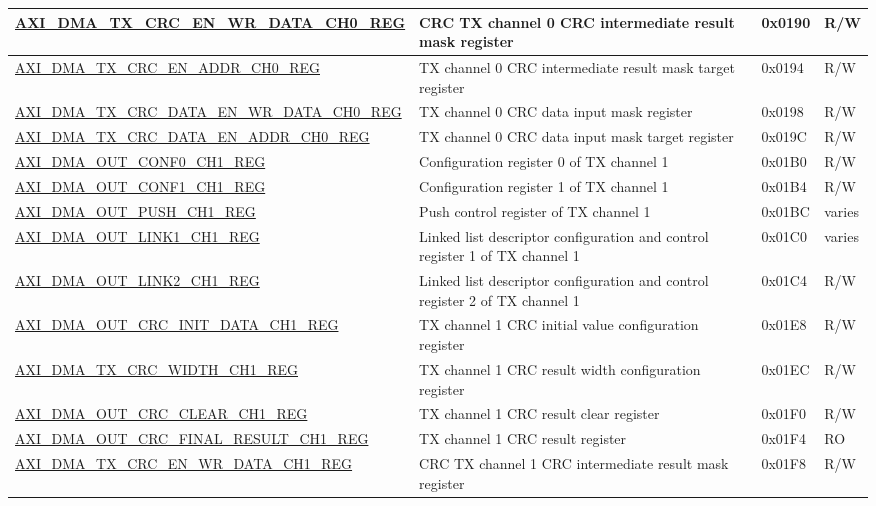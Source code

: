 \begin{longtable}{ | l | p{10cm} | p{1.3cm} | l | }
\hyperref[regdesc:AXIDMATXCRCENWRDATACHNREG]{AXI\_DMA\_TX\_CRC\_EN\_WR\_DATA\_CH0\_REG} & CRC TX channel 0 CRC intermediate result mask register & 0x0190 & R/W \\ \hline
\hyperref[regdesc:AXIDMATXCRCENADDRCHNREG]{AXI\_DMA\_TX\_CRC\_EN\_ADDR\_CH0\_REG} & TX channel 0 CRC intermediate result mask target register & 0x0194 & R/W \\ \hline
\hyperref[regdesc:AXIDMATXCRCDATAENWRDATACHNREG]{AXI\_DMA\_TX\_CRC\_DATA\_EN\_WR\_DATA\_CH0\_REG} & TX channel 0 CRC data input mask register & 0x0198 & R/W \\ \hline
\hyperref[regdesc:AXIDMATXCRCDATAENADDRCHNREG]{AXI\_DMA\_TX\_CRC\_DATA\_EN\_ADDR\_CH0\_REG} & TX channel 0 CRC data input mask target register & 0x019C & R/W \\ \hline
\hyperref[regdesc:AXIDMAOUTCONF0CHNREG]{AXI\_DMA\_OUT\_CONF0\_CH1\_REG} & Configuration register 0 of TX channel 1 & 0x01B0 & R/W \\ \hline
\hyperref[regdesc:AXIDMAOUTCONF1CHNREG]{AXI\_DMA\_OUT\_CONF1\_CH1\_REG} & Configuration register 1 of TX channel 1 & 0x01B4 & R/W \\ \hline
\hyperref[regdesc:AXIDMAOUTPUSHCHNREG]{AXI\_DMA\_OUT\_PUSH\_CH1\_REG} & Push control register of TX channel 1 & 0x01BC & varies \\ \hline
\hyperref[regdesc:AXIDMAOUTLINK1CHNREG]{AXI\_DMA\_OUT\_LINK1\_CH1\_REG} & Linked list descriptor configuration and control register 1 of TX channel 1 & 0x01C0 & varies \\ \hline
\hyperref[regdesc:AXIDMAOUTLINK2CHNREG]{AXI\_DMA\_OUT\_LINK2\_CH1\_REG} & Linked list descriptor configuration and control register 2 of TX channel 1 & 0x01C4 & R/W \\ \hline
\hyperref[regdesc:AXIDMAOUTCRCINITDATACHNREG]{AXI\_DMA\_OUT\_CRC\_INIT\_DATA\_CH1\_REG} & TX channel 1 CRC initial value configuration register & 0x01E8 & R/W \\ \hline
\hyperref[regdesc:AXIDMATXCRCWIDTHCHNREG]{AXI\_DMA\_TX\_CRC\_WIDTH\_CH1\_REG} & TX channel 1 CRC result width configuration register & 0x01EC & R/W \\ \hline
\hyperref[regdesc:AXIDMAOUTCRCCLEARCHNREG]{AXI\_DMA\_OUT\_CRC\_CLEAR\_CH1\_REG} & TX channel 1 CRC result clear register & 0x01F0 & R/W \\ \hline
\hyperref[regdesc:AXIDMAOUTCRCFINALRESULTCHNREG]{AXI\_DMA\_OUT\_CRC\_FINAL\_RESULT\_CH1\_REG} & TX channel 1 CRC result register & 0x01F4 & RO \\ \hline
\hyperref[regdesc:AXIDMATXCRCENWRDATACHNREG]{AXI\_DMA\_TX\_CRC\_EN\_WR\_DATA\_CH1\_REG} & CRC TX channel 1 CRC intermediate result mask register & 0x01F8 & R/W \\ \hline

\end{longtable}
